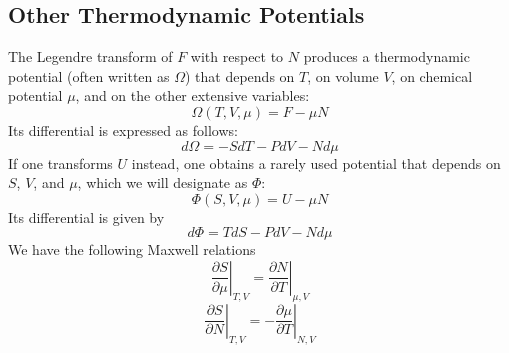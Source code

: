 \subsection{Other Thermodynamic Potentials}
The Legendre transform of $F$ with respect to $N$ produces a thermodynamic potential (often written as $\Omega$) that depends on $T$, on volume $V$, on chemical potential $\mu$, and on the other extensive variables:
\[\Omega(T,V,\mu) = F - \mu N\]
Its differential is expressed as follows:
\[d\Omega = -SdT - PdV - Nd\mu\]
If one transforms $U$ instead, one obtains a rarely used potential that depends on $S$, $V$, and $\mu$, which we will designate as $\Phi$:
\[\Phi(S,V,\mu) = U - \mu N\]
Its differential is given by
\[d\Phi = TdS - PdV - Nd\mu\]
We have the following Maxwell relations
\[\left. \frac{\partial S}{\partial \mu} \right|_{T,V} = \left. \frac{\partial N}{\partial T} \right|_{\mu,V}\]
\[\left. \frac{\partial S}{\partial N} \right|_{T,V} = - \left. \frac{\partial \mu}{\partial T} \right|_{N,V}\]

